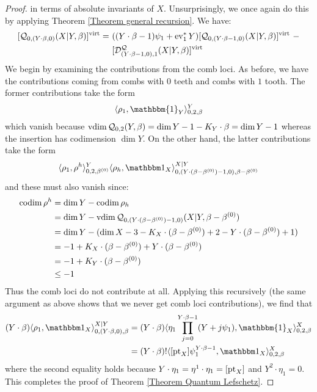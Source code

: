 \begin{proof}
in terms of absolute invariants of $X$. Unsurprisingly, we once again do this by applying Theorem \ref{Theorem general recursion}. We have:
\begin{align*} [\mathcal{Q}_{0,(Y \cdot \beta,0)}(X|Y,\beta)]^{\operatorname{virt}} = \ & ((Y\cdot\beta-1)\psi_1+\operatorname{ev}_1^*Y) [\mathcal{Q}_{0,(Y\cdot\beta-1,0)}(X|Y,\beta)]^{\operatorname{virt}} \ - \\
& [\mathcal{D}_{(Y\cdot\beta-1,0),1}^{\mathcal Q}(X|Y,\beta)]^{\operatorname{virt}} \end{align*}
We begin by examining the contributions from the comb loci. As before, we have the contributions coming from combs with $0$ teeth and combs with $1$ tooth. The former contributions take the form
\begin{equation*} \langle \rho_1 , \mathbbm{1}_Y \rangle_{0,2,\beta}^Y \end{equation*}
which vanish because $\operatorname{vdim}{\mathcal{Q}_{0,2}(Y,\beta)} = \dim Y -1 -K_Y\cdot\beta = \dim Y -1$ whereas the insertion has codimension $\dim Y$. On the other hand, the latter contributions take the form
\begin{equation*} \langle \rho_1 ,\rho^h\rangle_{0,2,\beta^{(0)}}^Y \langle \rho_h,\mathbbm 1_{X}\rangle_{0,(Y\cdot(\beta-\beta^{(0)})-1,0),\beta-\beta^{(0)}}^{X|Y}\end{equation*}
and these must also vanish since:
\begin{align*} \operatorname{codim} \rho^h & = \dim Y - \operatorname{codim} \rho_h \\
& = \dim Y - \operatorname{vdim} \mathcal{Q}_{0,(Y\cdot(\beta-\beta^{(0)})-1,0)}(X|Y,\beta-\beta^{(0)}) \\
& = \dim Y - (\dim X - 3 - K_X \cdot (\beta - \beta^{(0)}) + 2 - Y \cdot (\beta - \beta^{(0)}) + 1) \\
&= -1 + K_X \cdot (\beta-\beta^{(0)}) + Y \cdot (\beta-\beta^{(0)}) \\
& = -1 + K_Y\cdot(\beta-\beta^{(0)}) \\
& \leq -1
\end{align*}
Thus the comb loci do not contribute at all. Applying this recursively (the same argument as above shows that we never get comb loci contributions), we find that
\begin{align*}
(Y\cdot\beta)\langle \rho_1 ,\mathbbm 1_{X}\rangle_{0,(Y\cdot\beta,0),\beta}^{X|Y} & = (Y\cdot\beta) \langle \eta_1 \prod_{j=0}^{Y\cdot\beta-1}(Y+j\psi_1) , \mathbbm{1}_X \rangle_{0,2,\beta}^X \\
& = (Y\cdot\beta)!\langle[ \pt_X]\psi_1^{Y\cdot\beta-1},\mathbbm 1_X\rangle_{0,2,\beta}^X
\end{align*}
where the second equality holds because $Y\cdot\eta_1=\eta^1 \cdot \eta_1 = [\operatorname{pt}_X]$ and $Y^2\cdot\eta_1=0$. This completes the proof of Theorem \ref{Theorem Quantum Lefschetz}. \end{proof}

